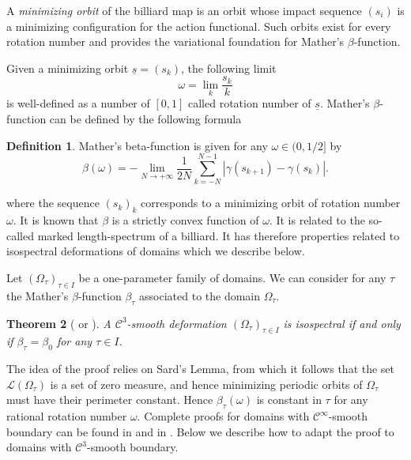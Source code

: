 \documentclass[12pt, openany]{amsart}
\newtheorem{theorem}{Theorem}%
\theoremstyle{definition}
\newtheorem{definition}[theorem]{Definition}
\theoremstyle{remark}
\theoremstyle{remark}
\theoremstyle{theorem}
\theoremstyle{theorem}
\theoremstyle{theorem}
\theoremstyle{theorem}
\begin{document}
A \emph{minimizing orbit} of the billiard map is an orbit whose impact sequence $(s_i)$ is a minimizing configuration 
for the action functional. Such orbits exist for every rotation number \cite{ForniMather, Gole} and provides the variational foundation for Mather's $\beta$-function. 

Given a minimizing orbit $\underline s = (s_k)$, the following limit
\[
\omega = \lim_k \frac{s_k}{k}
\]
is well-defined as a number of $[0,1]$ called rotation number of $\underline s$. Mather's $\beta$-function can be defined by the following formula

\begin{definition}
Mather's beta-function is given for any $\omega\in(0,1/2]$ by 
\begin{equation}
\beta(\omega) = -\lim_{N\to+\infty} \frac{1}{2N}\sum_{k=-N}^{N-1} |\gamma(s_{k+1}) - \gamma(s_k)|.
\end{equation}
\end{definition}

where the sequence $(s_k)_k$ corresponds to a minimizing orbit of rotation number $\omega$.
It is known \cite{FKS, Siburg} that $\beta$ is a strictly convex function of $\omega$. It is related to the so-called marked length-spectrum of a billiard. It has therefore properties related to isospectral deformations of domains which we describe below. 

Let $(\Omega_{\tau})_{\tau\in I}$ be a one-parameter family of domains. We can consider for any $\tau$ the Mather's $\beta$-function $\beta_{\tau}$ associated to the domain $\Omega_{\tau}$.


\begin{theorem}[\cite{FKS} or \cite{Siburg}]
\label{theorem:beta_isospectral_domains}
A $\mathscr C^3$-smooth deformation $(\Omega_{\tau})_{\tau\in I}$ is isospectral if and only if $\beta_{\tau}=\beta_0$ for any $\tau\in I$.
\end{theorem}

The idea of the proof relies on Sard's Lemma, from which it follows that the set $\mathscr L(\Omega_{\tau})$ is a set of zero measure, and hence minimizing periodic orbits of $\Omega_{\tau}$ must have their perimeter constant. Hence $\beta_{\tau}(\omega)$ is constant in $\tau$ for any rational rotation number $\omega$. Complete proofs for domains with $\mathscr C^{\infty}$-smooth boundary can be found in \cite[Theorem 2.12]{FKS} and in \cite[Corollary 3.2.3]{Siburg}. Below we describe how to adapt the proof to domains with $\mathscr C^3$-smooth boundary.
\end{document}
